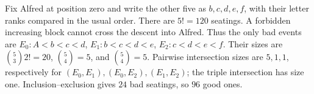 Fix Alfred at position zero and write the other five as $b,c,d,e,f$, with their letter ranks compared in the usual order. There are $5!=120$ seatings. A forbidden increasing block cannot cross the descent into Alfred. Thus the only bad events are $E_0:A<b<c<d$, $E_1:b<c<d<e$, $E_2:c<d<e<f$. Their sizes are $\binom53 2!=20$, $\binom54=5$, and $\binom54=5$. Pairwise intersection sizes are $5,1,1$, respectively for $(E_0,E_1),(E_0,E_2),(E_1,E_2)$; the triple intersection has size one. Inclusion--exclusion gives $24$ bad seatings, so $\boxed{96}$ good ones.
